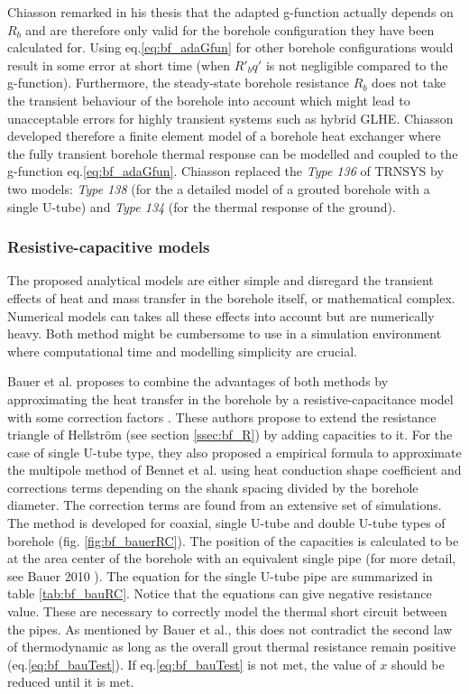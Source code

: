 \documentclass[a4paper,oneside,11pt]{report}
\begin{document}
Chiasson remarked in his thesis  \cite{chi07} that the adapted g-function actually depends on $R_b$ and are therefore only valid for the borehole configuration they have been calculated for. Using eq.\ref{eq:bf_adaGfun} for other borehole configurations would result in some error at short time (when $R'_b q'$ is not negligible compared to the g-function). Furthermore, the steady-state borehole resistance $R_b$ does not take the transient behaviour of the borehole into account which might lead to unacceptable errors for highly transient systems such as hybrid GLHE. Chiasson developed therefore a finite element model of a borehole heat exchanger where the fully transient borehole thermal response can be modelled and coupled to the g-function eq.\ref{eq:bf_adaGfun}. Chiasson replaced the \textit{Type 136} of TRNSYS by two models: \textit{Type 138} (for the a detailed model of a grouted borehole with a single U-tube) and \textit{Type 134} (for the thermal response of the ground).


\subsubsection*{Resistive-capacitive models}

The proposed analytical models are either simple and disregard the transient effects of heat and mass transfer in the borehole itself, or mathematical complex. Numerical models can takes all these effects into account but are numerically heavy. Both method might be cumbersome to use in a simulation environment where computational time and modelling simplicity are crucial. 

Bauer et al. proposes to combine the advantages of both methods by approximating the heat transfer in the borehole by a resistive-capacitance model with some correction factors \cite{bau10}. These authors propose to extend the resistance triangle of Hellstr\"om (see section \ref{ssec:bf_R}) by adding capacities to it. For the case of single U-tube type, they also proposed a empirical formula to approximate the multipole method of Bennet et al. using heat conduction shape coefficient and corrections terms depending on the shank spacing divided by the borehole diameter. The correction terms are found from an extensive set of simulations. The method is developed for coaxial, single U-tube and double U-tube types of borehole (fig. \ref{fig:bf_bauerRC}). The position of the capacities is calculated to be at the area center of the borehole with an equivalent single pipe (for more detail, see Bauer 2010 \cite{bau10}). The equation for the single U-tube pipe are summarized in table \ref{tab:bf_bauRC}. Notice that the equations can give negative resistance value. These are necessary to correctly model the thermal short circuit between the pipes. As mentioned by Bauer et al., this does not contradict the second law of thermodynamic as long as the overall grout thermal resistance remain positive (eq.\ref{eq:bf_bauTest}). If eq.\ref{eq:bf_bauTest} is not met, the value of $x$ should be reduced until it is met.
\end{document}
